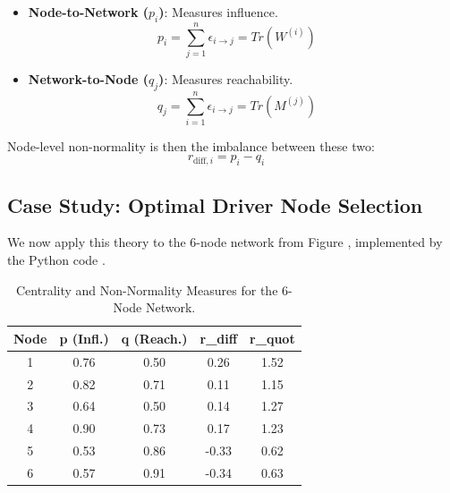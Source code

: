 \documentclass[10pt, a4paper]{article}
\begin{document}
\begin{itemize}
    \item \textbf{Node-to-Network ($p_i$)}: Measures influence.
    \begin{equation}
        p_i = \sum_{j=1}^{n} \epsilon_{i \to j} = Tr(W^{(i)}) \quad 
    \end{equation}
    \item \textbf{Network-to-Node ($q_j$)}: Measures reachability.
    \begin{equation}
        q_j = \sum_{i=1}^{n} \epsilon_{i \to j} = Tr(M^{(j)}) \quad 
    \end{equation}
\end{itemize}
Node-level non-normality is then the imbalance between these two:
\begin{equation}
    r_{\text{diff},i} = p_i - q_i \quad 
\end{equation}


\subsection{Case Study: Optimal Driver Node Selection}
We now apply this theory to the 6-node network from Figure , implemented by the Python code .


\begin{table}[H]
    \centering
    \caption{Centrality and Non-Normality Measures for the 6-Node Network.}
    \label{tab:centrality_case_study}
    \begin{tabular}{@{}ccccc@{}}
        \toprule
        \textbf{Node} & \textbf{p (Infl.)} & \textbf{q (Reach.)} & \textbf{r\_diff} & \textbf{r\_quot} \\ \midrule
        1 & 0.76 & 0.50 & 0.26 & 1.52 \\
        2 & 0.82 & 0.71 & 0.11 & 1.15 \\
        3 & 0.64 & 0.50 & 0.14 & 1.27 \\
        4 & 0.90 & 0.73 & 0.17 & 1.23 \\
        5 & 0.53 & 0.86 & -0.33 & 0.62 \\
        6 & 0.57 & 0.91 & -0.34 & 0.63 \\ \bottomrule
    \end{tabular}
\end{table}
\end{document}
